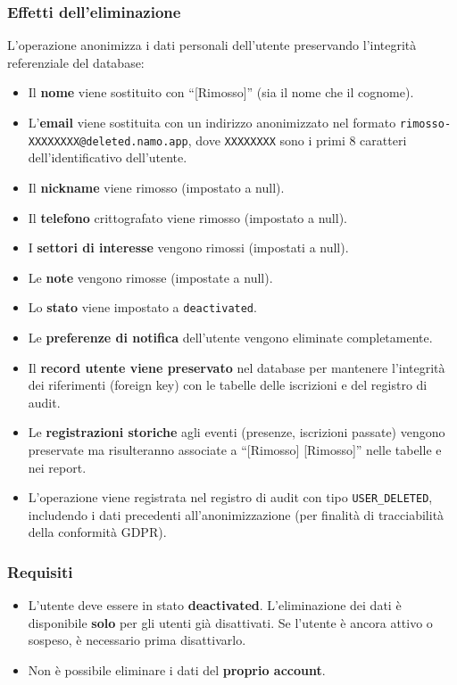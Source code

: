 \documentclass[a4paper,11pt,oneside]{book}
\begin{document}
\subsubsection{Effetti dell'eliminazione}

L'operazione anonimizza i dati personali dell'utente preservando l'integrit\`a referenziale del database:

\begin{itemize}[leftmargin=1.5em]
  \item Il \textbf{nome} viene sostituito con ``[Rimosso]'' (sia il nome che il cognome).
  \item L'\textbf{email} viene sostituita con un indirizzo anonimizzato nel formato \texttt{rimosso-XXXXXXXX@deleted.namo.app}, dove \texttt{XXXXXXXX} sono i primi 8 caratteri dell'identificativo dell'utente.
  \item Il \textbf{nickname} viene rimosso (impostato a null).
  \item Il \textbf{telefono} crittografato viene rimosso (impostato a null).
  \item I \textbf{settori di interesse} vengono rimossi (impostati a null).
  \item Le \textbf{note} vengono rimosse (impostate a null).
  \item Lo \textbf{stato} viene impostato a \texttt{deactivated}.
  \item Le \textbf{preferenze di notifica} dell'utente vengono eliminate completamente.
  \item Il \textbf{record utente viene preservato} nel database per mantenere l'integrit\`a dei riferimenti (foreign key) con le tabelle delle iscrizioni e del registro di audit.
  \item Le \textbf{registrazioni storiche} agli eventi (presenze, iscrizioni passate) vengono preservate ma risulteranno associate a ``[Rimosso] [Rimosso]'' nelle tabelle e nei report.
  \item L'operazione viene registrata nel registro di audit con tipo \texttt{USER\_DELETED}, includendo i dati precedenti all'anonimizzazione (per finalit\`a di tracciabilit\`a della conformit\`a GDPR).
\end{itemize}

\subsubsection{Requisiti}

\begin{itemize}[leftmargin=1.5em]
  \item L'utente deve essere in stato \textbf{deactivated}. L'eliminazione dei dati \`e disponibile \textbf{solo} per gli utenti gi\`a disattivati. Se l'utente \`e ancora attivo o sospeso, \`e necessario prima disattivarlo.
  \item Non \`e possibile eliminare i dati del \textbf{proprio account}.
\end{itemize}
\end{document}
